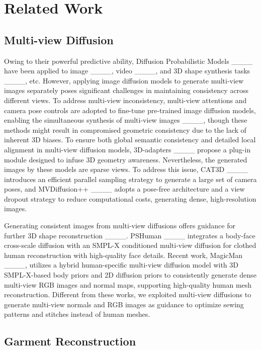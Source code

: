 \section{Related Work}
\subsection{Multi-view Diffusion} 

Owing to their powerful predictive ability, Diffusion Probabilistic Models ____ have been applied to image ____, video ____, and 3D shape synthesis tasks ____, etc. However, applying image diffusion models to generate multi-view images separately poses significant challenges in maintaining consistency across different views. To address multi-view inconsistency, multi-view attentions and camera pose controls are adopted to fine-tune pre-trained image diffusion models, enabling the simultaneous synthesis of multi-view images ____, though these methods might result in compromised geometric consistency due to the lack of inherent 3D biases. To ensure both global semantic consistency and detailed local alignment in multi-view diffusion models, 3D-adapters ____ propose a plug-in module designed to infuse 3D geometry awareness. Nevertheless, the generated images by these models are sparse views. To address this issue, CAT3D ____ introduces an efficient parallel sampling strategy to generate a large set of camera poses, and MVDiffusion++ ____ adopts a pose-free architecture and a view dropout strategy to reduce computational costs, generating dense, high-resolution images. 

Generating consistent images from multi-view diffusions offers guidance for further 3D shape reconstruction ____. PSHuman ____ integrates a body-face cross-scale diffusion with an SMPL-X conditioned multi-view diffusion for clothed human reconstruction with high-quality face details. Recent work, MagicMan ____, utilizes a hybrid human-specific multi-view diffusion model with 3D SMPL-X-based body priors and 2D diffusion priors to consistently generate dense multi-view RGB images and normal maps, supporting high-quality human mesh reconstruction. Different from these works, we exploited multi-view diffusions to generate multi-view normals and RGB images as guidance to optimize sewing patterns and stitches instead of human meshes.



\subsection{Garment Reconstruction}


